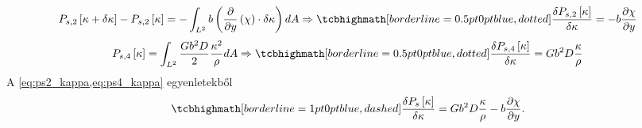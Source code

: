 \documentclass[10pt,a4paper]{scrartcl}
\begin{document}
\begin{equation} \label{eq:ps2_kappa}
{P_{s,2}}\left[ {\kappa  + \delta \kappa } \right] - {P_{s,2}}\left[ \kappa  \right] =  - \int_{{L^2}} {b\left( {\frac{\partial }{{\partial y}}\left( \chi  \right) \cdot \delta \kappa } \right)dA}  \Rightarrow \tcbhighmath[borderline={0.5pt}{0pt}{blue,dotted}]{ \frac{{\delta {P_{s,2}}\left[ \kappa  \right]}}{{\delta \kappa }} =  - b\frac{{\partial \chi }}{{\partial y}}}
\end{equation}
\begin{equation} \label{eq:ps4_kappa}
{P_{s,4}}\left[ \kappa  \right] = \int_{{L^2}} {\frac{{G{b^2}D}}{2}\frac{{{\kappa ^2}}}{\rho }dA}  \Rightarrow \tcbhighmath[borderline={0.5pt}{0pt}{blue,dotted}]{\frac{{\delta {P_{s,4}}\left[ \kappa  \right]}}{{\delta \kappa }} = G{b^2}D\frac{\kappa }{\rho }}
\end{equation}
A \cref{eq:ps2_kappa,eq:ps4_kappa} egyenletekből
\begin{equation} \label{eq:ps_kappa}
\tcbhighmath[borderline={1pt}{0pt}{blue,dashed}]{\frac{{\delta {P_s}\left[ \kappa  \right]}}{{\delta \kappa }} = G{b^2}D\frac{\kappa }{\rho } - b\frac{{\partial \chi }}{{\partial y}}.}
\end{equation}
\end{document}
